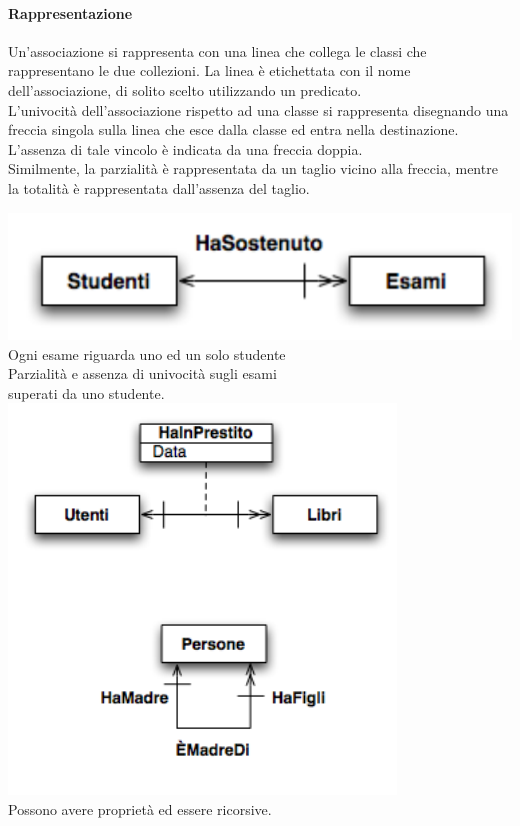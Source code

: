 \documentclass[10pt]{book}
\begin{document}
\paragraph{Rappresentazione} Un'associazione si rappresenta con una linea che collega le classi che rappresentano le due collezioni. La linea è etichettata con il nome dell'associazione, di solito scelto utilizzando un predicato.\\
L'univocità dell'associazione rispetto ad una classe si rappresenta disegnando una freccia singola sulla linea che esce dalla classe ed entra nella destinazione. L'assenza di tale vincolo è indicata da una freccia doppia.\\
Similmente, la parzialità è rappresentata da un taglio vicino alla freccia, mentre la totalità è rappresentata dall'assenza del taglio.
\begin{center}
	\includegraphics[scale=0.5]{assocesemp.png}\\
	Ogni esame riguarda uno ed un solo studente\\
	Parzialità e assenza di univocità sugli esami\\
	superati da uno studente.\\
	\includegraphics[scale=0.65]{assocesemp2.png}\\
	Possono avere proprietà ed essere ricorsive.
\end{center}
\pagebreak
\end{document}
